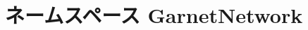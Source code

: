 \hypertarget{namespaceGarnetNetwork}{
\section{ネームスペース GarnetNetwork}
\label{namespaceGarnetNetwork}
}
